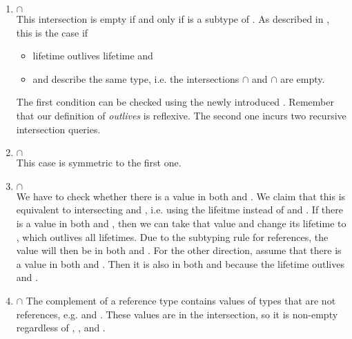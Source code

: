 \begin{enumerate}
\item {} $\cap$ \\
This intersection is empty if and only if  is a subtype of .
As described in , this is the case if
\begin{itemize}
\item lifetime  outlives lifetime  and
\item {} and  describe the same type, i.e. the intersections  $\cap$  and  $\cap$  are empty.
\end{itemize}

The first condition can be checked using the newly introduced .
Remember that our definition of \emph{outlives} is reflexive.
The second one incurs two recursive intersection queries.

\item {} $\cap$ \\
This case is symmetric to the first one.

\item {} $\cap$ \\
We have to check whether there is a value in both  and .
We claim that this is equivalent to intersecting  and , i.e. using the lifeitme \whileyinline{*} instead of  and .
If there is a value in both  and , then we can take that value and change its lifetime to \whileyinline{*}, which outlives all lifetimes.
Due to the subtyping rule for references, the value will then be in both  and .
For the other direction, assume that there is a value in both  and .
Then it is also in both  and  because the lifetime \whileyinline{*} outlives  and .


\item {} $\cap$ 
The complement of a reference type contains values of types that are not references, e.g.  and .
These values are in the intersection, so it is non-empty regardless of , ,  and .
\end{enumerate}


